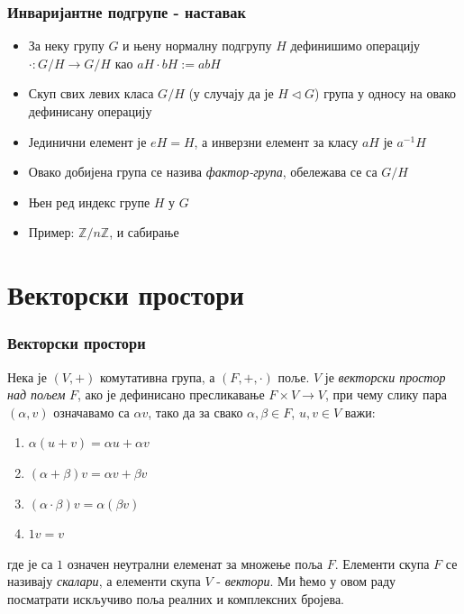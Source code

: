 \documentclass{beamer}
\theoremstyle{plain}
\theoremstyle{definition}
\begin{document}
\begin{frame}
\frametitle{Инваријантне подгрупе - наставак}
\begin{itemize}
\item За неку групу $G$ и њену нормалну подгрупу $H$ дефинишимо операцију $\cdot: G/H \to G/H$ као $aH\cdot bH := abH$
\item Скуп свих левих класа $G/H$ (у случају да је $H\lhd G$) група у односу на овако дефинисану операцију
\item Јединични елемент је $eH = H$, а инверзни елемент за класу $aH$ је $a^{-1}H$
\item Овако добијена група се назива \emph{фактор-група}, обележава се са $G/H$
\item Њен ред индекс групе $H$ у $G$
\item Пример: $\mathbb{Z}/n\mathbb{Z}$, и сабирање
\end{itemize}
\end{frame}

\section{Векторски простори}

\begin{frame}
\frametitle{Векторски простори}
Нека је $(V, +)$ комутативна група, а $(F, +, \cdot)$ поље. $V$ је \emph{векторски простор над пољем} $F$, ако је дефинисано пресликавање $F\times V\to V$, при чему слику пара $(\alpha, v)$ означавамо са $\alpha v$, тако да за свако $\alpha, \beta \in F$, $u, v\in V$ важи:
\begin{enumerate}
\item $\alpha(u+v) = \alpha u+\alpha v$
\item $(\alpha + \beta)v = \alpha v+ \beta v$
\item $(\alpha\cdot\beta)v = \alpha(\beta v)$
\item $1v = v$
\end{enumerate}
где је са $1$ означен неутрални елеменат за множење поља $F$. Елементи скупа $F$ се називају \emph{скалари}, а елементи скупа $V$ - \emph{вектори}. Ми ћемо у овом раду посматрати искључиво поља реалних и комплексних бројева.
\end{frame}
\end{document}
